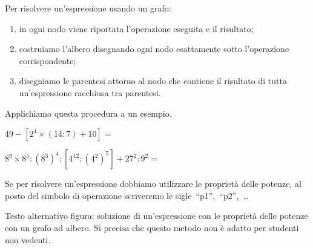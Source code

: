 \begin{procedura}{}{}
 Per risolvere un'espressione usando un grafo:
\begin{enumerate} [noitemsep]
 \item in ogni nodo viene riportata l'operazione eseguita e il risultato;
 \item costruiamo l'albero disegnando ogni nodo esattamente sotto
  l'operazione corrispondente;
 \item disegniamo le parentesi attorno al nodo che contiene il
  risultato di tutta un'espressione racchiusa tra parentesi.
\end{enumerate}
\end{procedura}

Applichiamo questa procedura a un esempio.

\bigskip

\begin{esempio}{}{}
\(49 - [2^4 \times (14 : 7) + 10]=\)

\vspace{.5em}
\end{esempio}

\begin{esempio}{}{}
\(8^9 \times 8^5 : (8^3)^4 : [4^{12} : (4^2)^5] + 27^2 : 9^2 =\)

\vspace{.5em}
Se per risolvere un'espressione dobbiamo utilizzare le proprietà delle 
potenze, al posto del simbolo di operazione scriveremo le 
sigle~``p1'',~``p2'',~\dots 

\immagine
{Testo alternativo figura: soluzione di un'espressione con le proprietà 
delle potenze con un grafo ad albero. 
Si precisa che questo metodo non è adatto per studenti non vedenti.} 
\espalberob
\end{esempio}

